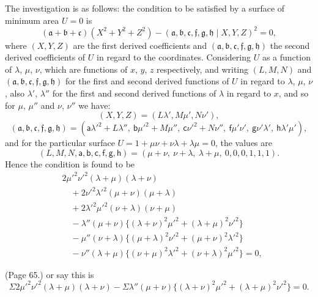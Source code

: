\documentclass[11pt,a4paper]{article}
\begin{document}
The investigation is as follows: the condition to be satisfied by a surface of minimum area $U = 0$ is
\[
(\mathfrak{a} + \mathfrak{b} + \mathfrak{c})(X^2 + Y^2 + Z^2) - (\mathfrak{a}, \mathfrak{b}, \mathfrak{c}, \mathfrak{f}, \mathfrak{g}, \mathfrak{h} \mid X, Y, Z)^2 = 0,
\]
where $(X, Y, Z)$ are the first derived coefficients and $(\mathfrak{a}, \mathfrak{b}, \mathfrak{c}, \mathfrak{f}, \mathfrak{g}, \mathfrak{h})$ the second derived coefficients of $U$ in regard to the coordinates. Considering $U$ as a function of $\lambda$, $\mu$, $\nu$, which are functions of $x$, $y$, $z$ respectively, and writing $(L, M, N)$ and $(\mathfrak{a}, \mathfrak{b}, \mathfrak{c}, \mathfrak{f}, \mathfrak{g}, \mathfrak{h})$ for the first and second derived functions of $U$ in regard to $\lambda$, $\mu$, $\nu$, also $\lambda'$, $\lambda''$ for the first and second derived functions of $\lambda$ in regard to $x$, and so for $\mu$, $\mu''$ and $\nu$, $\nu''$ we have:
\[
(X, Y, Z) = (L\lambda', M\mu', N\nu'),
\]
\[
(\mathfrak{a}, \mathfrak{b}, \mathfrak{c}, \mathfrak{f}, \mathfrak{g}, \mathfrak{h}) = (\mathsf{a}\lambda'^2 + L\lambda'',\ \mathsf{b}\mu'^2 + M\mu'',\ \mathsf{c}\nu'^2 + N\nu'',\ \mathsf{f}\mu'\nu',\ \mathsf{g}\nu'\lambda',\ \mathsf{h}\lambda'\mu'),
\]
and for the particular surface $U = 1 + \mu\nu + \nu\lambda + \lambda\mu = 0$, the values are
\[
(L, M, N, \mathsf{a}, \mathsf{b}, \mathsf{c}, \mathsf{f}, \mathsf{g}, \mathsf{h}) = (\mu + \nu,\ \nu + \lambda,\ \lambda + \mu,\ 0, 0, 0, 1, 1, 1).
\]
Hence the condition is found to be
\begin{align*}
& 2\mu'^2\nu'^2 (\lambda + \mu)(\lambda + \nu) \\
& \quad + 2\nu'^2\lambda'^2 (\mu + \nu)(\mu + \lambda) \\
& \quad + 2\lambda'^2\mu'^2 (\nu + \lambda)(\nu + \mu) \\
& \quad - \lambda'' (\mu + \nu) \{(\lambda + \nu)^2 \mu'^2 + (\lambda + \mu)^2 \nu'^2\} \\
& \quad - \mu'' (\nu + \lambda) \{(\mu + \lambda)^2 \nu'^2 + (\mu + \nu)^2 \lambda'^2\} \\
& \quad - \nu'' (\lambda + \mu) \{(\nu + \mu)^2 \lambda'^2 + (\nu + \lambda)^2 \mu'^2\} = 0,
\end{align*}

\bigskip

\noindent (Page 65.) or say this is
\[
\Sigma 2 \mu'^2 \nu'^2 (\lambda + \mu)(\lambda + \nu) - \Sigma \lambda'' (\mu + \nu) \{(\lambda + \nu)^2 \mu'^2 + (\lambda + \mu)^2 \nu'^2\} = 0.
\]
\end{document}
